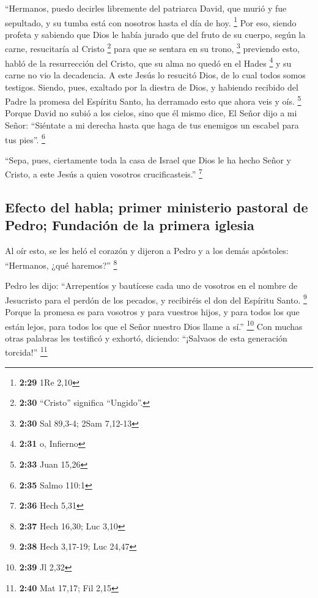  ``Hermanos, puedo decirles libremente del patriarca
David, que murió y fue sepultado, y su tumba está con nosotros hasta el
día de hoy. \footnote{\textbf{2:29} 1Re 2,10}  Por eso,
siendo profeta y sabiendo que Dios le había jurado que del fruto de su
cuerpo, según la carne, resucitaría al Cristo \footnote{\textbf{2:30}
  ``Cristo'' significa ``Ungido''.} para que se sentara en su trono,
\footnote{\textbf{2:30} Sal 89,3-4; 2Sam 7,12-13} 
previendo esto, habló de la resurrección del Cristo, que su alma no
quedó en el Hades \footnote{\textbf{2:31} o, Infierno} y su carne no vio
la decadencia.  A este Jesús lo resucitó Dios, de lo cual
todos somos testigos.  Siendo, pues, exaltado por la
diestra de Dios, y habiendo recibido del Padre la promesa del Espíritu
Santo, ha derramado esto que ahora veis y oís. \footnote{\textbf{2:33}
  Juan 15,26}  Porque David no subió a los cielos, sino
que él mismo dice, El Señor dijo a mi Señor: ``Siéntate a mi derecha
 hasta que haga de tus enemigos un escabel para tus
pies''. \footnote{\textbf{2:35} Salmo 110:1}

 ``Sepa, pues, ciertamente toda la casa de Israel que
Dios le ha hecho Señor y Cristo, a este Jesús a quien vosotros
crucificasteis.'' \footnote{\textbf{2:36} Hech 5,31}

\hypertarget{efecto-del-habla-primer-ministerio-pastoral-de-pedro-fundaciuxf3n-de-la-primera-iglesia}{%
\subsection{Efecto del habla; primer ministerio pastoral de Pedro;
Fundación de la primera
iglesia}\label{efecto-del-habla-primer-ministerio-pastoral-de-pedro-fundaciuxf3n-de-la-primera-iglesia}}

 Al oír esto, se les heló el corazón y dijeron a Pedro y
a los demás apóstoles: ``Hermanos, ¿qué haremos?'' \footnote{\textbf{2:37}
  Hech 16,30; Luc 3,10}

 Pedro les dijo: ``Arrepentíos y bautícese cada uno de
vosotros en el nombre de Jesucristo para el perdón de los pecados, y
recibiréis el don del Espíritu Santo. \footnote{\textbf{2:38} Hech
  3,17-19; Luc 24,47}  Porque la promesa es para vosotros
y para vuestros hijos, y para todos los que están lejos, para todos los
que el Señor nuestro Dios llame a sí.'' \footnote{\textbf{2:39} Jl 2,32}
 Con muchas otras palabras les testificó y exhortó,
diciendo: ``¡Salvaos de esta generación torcida!'' \footnote{\textbf{2:40}
  Mat 17,17; Fil 2,15}

